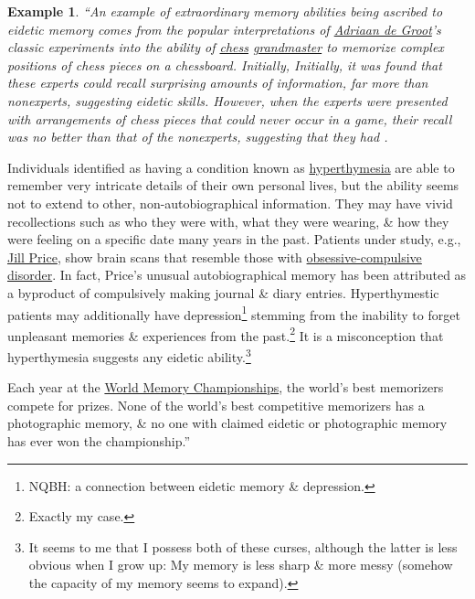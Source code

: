 \documentclass[oneside]{book}
\numberwithin{equation}{section}
\newtheorem{example}{Example}[chapter]
\begin{document}
\begin{example}
	``An example of extraordinary memory abilities being ascribed to eidetic memory comes from the popular interpretations of \href{https://en.wikipedia.org/wiki/Adriaan_de_Groot}{Adriaan de Groot}'s classic experiments into the ability of \href{https://en.wikipedia.org/wiki/Chess}{chess} \href{https://en.wikipedia.org/wiki/Grandmaster_(chess)}{grandmaster} to memorize complex positions of chess pieces on a chessboard. Initially, Initially, it was found that these experts could recall surprising amounts of information, far more than nonexperts, suggesting eidetic skills. However, when the experts were presented with arrangements of chess pieces that could never occur in a game, their recall was no better than that of the nonexperts, suggesting that they had .
\end{example}
Individuals identified as having a condition known as \href{https://en.wikipedia.org/wiki/Hyperthymesia}{hyperthymesia} are able to remember very  intricate details of their own personal lives, but the ability seems not to extend to other, non-autobiographical information. They may have vivid recollections such as who they were with, what they were wearing, \& how they were feeling on a specific date many years in the past. Patients under study, e.g., \href{https://en.wikipedia.org/wiki/Jill_Price}{Jill Price}, show brain scans that resemble those with \href{https://en.wikipedia.org/wiki/Obsessive-compulsive_disorder}{obsessive-compulsive disorder}. In fact, Price's unusual autobiographical memory has been attributed as a byproduct of compulsively making journal \& diary entries. Hyperthymestic patients may additionally have depression\footnote{NQBH: a connection between eidetic memory \& depression.} stemming from the inability to forget unpleasant memories \& experiences from the past.\footnote{Exactly my case.} It is a misconception that hyperthymesia suggests any eidetic ability.\footnote{It seems to me that I possess both of these curses, although the latter is less obvious when I grow up: My memory is less sharp \& more messy (somehow the capacity of my memory seems to expand).}

Each year at the \href{https://en.wikipedia.org/wiki/World_Memory_Championships}{World Memory Championships}, the world's best memorizers compete for prizes. None of the world's best competitive memorizers has a photographic memory, \& no one with claimed eidetic or photographic memory has ever won the championship.''
\end{document}
